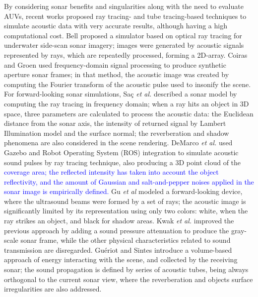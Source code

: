 \documentclass[final,5p,times]{elsarticle}
\begin{document}
By considering sonar benefits and singularities along with the need to evaluate AUVs,
recent works proposed ray tracing- \cite{bell1997,coiras2009,sac2015,demarco2015,gu2013,kwak2015}
and tube tracing-based \cite{gueriot2010} techniques to simulate acoustic data
with very accurate results, although having a high computational cost.
Bell \cite{bell1997} proposed a simulator based on optical ray tracing for
underwater side-scan sonar imagery; images were generated by acoustic
signals represented by rays, which are repeatedly processed, forming a
2D-array. Coiras and Groen \cite{coiras2009} used frequency-domain
signal processing to produce synthetic aperture sonar frames; in that method,
the acoustic image was created by computing the Fourier transform of the
acoustic pulse used to insonify the scene. For forward-looking sonar
simulations, Saç \textit{et al.}
\cite{sac2015} described a sonar model by computing the ray tracing in
frequency domain; when a ray hits an object in 3D space, three parameters
are calculated to process the acoustic data: the Euclidean distance from
the sonar axis, the intensity of returned signal by Lambert Illumination
model and the surface normal; the reverberation and shadow phenomena are
also considered in the scene rendering. DeMarco \textit{et al.}
\cite{demarco2015} used Gazebo and Robot Operating System (ROS)
\cite{quigley2009} integration to simulate acoustic sound pulses by
ray tracing technique, also producing a 3D point cloud of the \textcolor{blue}{coverage area; the reflected intensity has taken into account the object reflectivity, and the amount of Gaussian and salt-and-pepper noises applied in the sonar image is empirically defined.} Gu \textit{et al} \cite{gu2013} modeled a forward-looking device, where the ultrasound beams were formed by a set of rays; the acoustic image is significantly limited by its representation using only two colors: white, when the ray strikes an object, and black for shadow areas. Kwak \textit{et al.} \cite{kwak2015} improved the previous approach by adding a sound pressure attenuation to produce the gray-scale sonar frame, while the other physical characteristics related to sound transmission are disregarded. Guériot and Sintes \cite{gueriot2010} introduce a volume-based
approach of energy interacting with the scene, and collected by the receiving
sonar; the sound propagation is defined by series of acoustic tubes, being
always orthogonal to the current sonar view, where the reverberation and
objects surface irregularities are also addressed.
\end{document}

